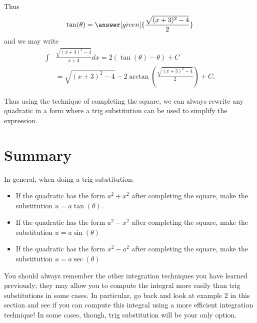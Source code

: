 \documentclass{ximera}
\begin{document}
\begin{example}
\begin{explanation}
   
    Thus
    \[
    \tan(\theta) = \answer[given]{\frac{\sqrt{(x+3)^{2}-4}}{2}}
    \]
    and we may write
    \begin{align*}
    \int &\frac{\sqrt{(x+3)^2-4}}{x+3} dx = 2\left(\tan(\theta) - \theta\right) + C\\
      &= \sqrt{(x+3)^{2}-4} - 2\arctan\left(\frac{\sqrt{(x+3)^{2}-4}}{2}\right) + C.
    \end{align*}
  \end{explanation}
\end{example}

Thus using the technique of completing the square, we can always rewrite any quadratic in a form where a trig
substitution can be used to simplify the expression. 



\section{Summary}

In general, when doing a trig substitution:
\begin{itemize}
\item If the quadratic has the form $a^2 + x^2$ after completing the square, make the substitution $u = a\tan(\theta)$. 
\item If the quadratic has the form $a^2 - x^2$ after completing the square, make the substitution $u = a\sin(\theta)$ 
\item If the quadratic has the form $x^2 - a^2$ after completing the
  square, make the substitution $u = a\sec(\theta)$
\end{itemize}

You should always remember the other integration techniques you have learned previously; they may allow you to compute the integral more easily than trig substitutions in some cases. In particular, go back and look at example 2 in this section and see if you can compute this integral using a more efficient integration technique!  In some cases, though, trig substitution will be your only option.
\end{document}
